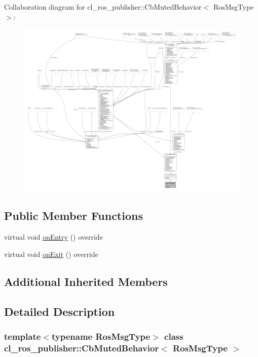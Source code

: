 Collaboration diagram for cl\+\_\+ros\+\_\+publisher\+:\+:Cb\+Muted\+Behavior$<$ Ros\+Msg\+Type $>$\+:
\nopagebreak
\begin{figure}[H]
\begin{center}
\leavevmode
\includegraphics[width=350pt]{classcl__ros__publisher_1_1CbMutedBehavior__coll__graph}
\end{center}
\end{figure}
\subsection*{Public Member Functions}
\begin{DoxyCompactItemize}
\item 
virtual void \hyperlink{classcl__ros__publisher_1_1CbMutedBehavior_a79376d9160e3bd44678a2c0d89f1b4de}{on\+Entry} () override
\item 
virtual void \hyperlink{classcl__ros__publisher_1_1CbMutedBehavior_a4c02187c58358fa811777d9956510222}{on\+Exit} () override
\end{DoxyCompactItemize}
\subsection*{Additional Inherited Members}


\subsection{Detailed Description}
\subsubsection*{template$<$typename Ros\+Msg\+Type$>$\newline
class cl\+\_\+ros\+\_\+publisher\+::\+Cb\+Muted\+Behavior$<$ Ros\+Msg\+Type $>$}



